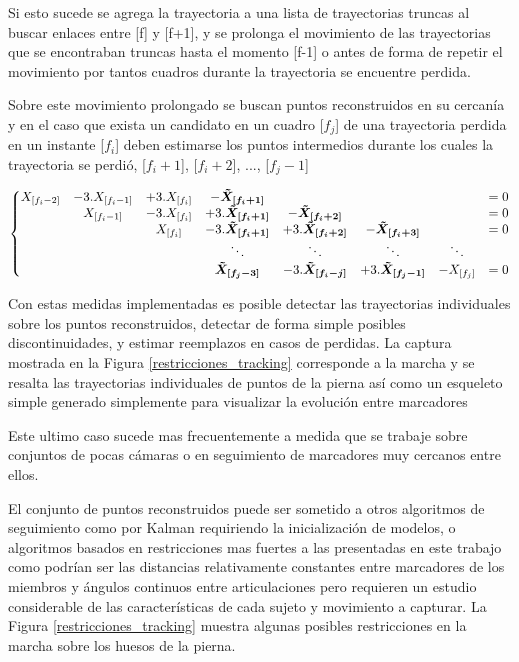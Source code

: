 Si esto sucede se agrega la trayectoria a una lista de trayectorias truncas al buscar enlaces entre [f] y [f+1], y se prolonga el movimiento de las trayectorias que se encontraban truncas hasta el momento [f-1] o antes de forma de repetir el movimiento por tantos cuadros durante la trayectoria se encuentre perdida. 

Sobre este movimiento prolongado se buscan puntos reconstruidos en su cercanía y en el caso que exista un candidato en un cuadro [$f_{j}$] de una trayectoria perdida en un instante [$f_{i}$] deben estimarse los puntos intermedios durante los cuales la trayectoria se perdió, [$f_{i}+1$], [$f_{i}+2$], ..., [$f_{j}-1$]

{\scriptsize \begin{equation}
\hspace{-0cm}
\left\{
\begin{matrix}
X_{[f_{i}-2]} &-3.X_{[f_{i}-1]} &+3.X_{[f_{i}]} &-\boldsymbol{\tilde{X}_{[f_{i}+1]}} & & & &=0 \\
& X_{[f_{i}-1]} &-3.X_{[f_{i}]} &+3.\boldsymbol{\tilde{X}_{[f_{i}+1]}} &-\boldsymbol{\tilde{X}_{[f_{i}+2]}} & & &=0 \\
& & X_{[f_{i}]} &-3.\boldsymbol{\tilde{X}_{[f_{i}+1]}} &+3.\boldsymbol{\tilde{X}_{[f_{i}+2]}} &-\boldsymbol{\tilde{X}_{[f_{i}+3]}}& &=0 \\
& & & \ddots & \ddots & \ddots & \ddots & \\
& & & \boldsymbol{\tilde{X}_{[f_{j}-3]}} &-3.\boldsymbol{\tilde{X}_{[f_{i}-j]}} &+3.\boldsymbol{\tilde{X}_{[f_{j}-1]}} &-X_{[f_{j}]} &=0 \\
\end{matrix}
\right.
\label{ecuaciones_estimacion_n}
\end{equation}}

Con estas medidas implementadas es posible detectar las trayectorias individuales sobre los puntos reconstruidos, detectar de forma simple posibles discontinuidades, y estimar reemplazos en casos de perdidas. La captura mostrada en la Figura \ref{restricciones_tracking} corresponde a la marcha y se resalta las trayectorias individuales de puntos de la pierna así como un esqueleto simple generado simplemente para visualizar la evolución entre marcadores

Este ultimo caso sucede mas frecuentemente a medida que se trabaje sobre conjuntos de pocas cámaras o en seguimiento de marcadores muy cercanos entre ellos. 

El conjunto de puntos reconstruidos puede ser sometido a otros algoritmos de seguimiento como por Kalman \cite{kalman} requiriendo la inicialización de modelos, o algoritmos basados en restricciones mas fuertes a las presentadas en este trabajo como podrían ser las distancias relativamente constantes entre marcadores de los miembros y ángulos continuos entre articulaciones pero requieren un estudio considerable de las características de cada sujeto y movimiento a capturar. La Figura \ref{restricciones_tracking} muestra algunas posibles restricciones en la marcha sobre los huesos de la pierna.

